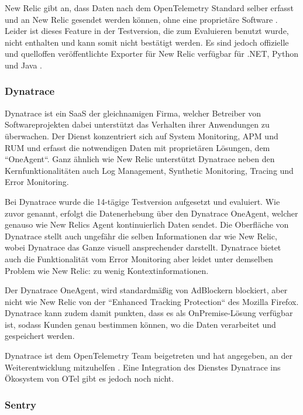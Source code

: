 New Relic gibt an, dass Daten nach dem OpenTelemetry Standard selber erfasst und an New Relic gesendet werden können, ohne eine proprietäre Software \cite{NewRelicAnnoundOTelBetaSupport}. Leider ist dieses Feature in der Testversion, die zum Evaluieren benutzt wurde, nicht enthalten und kann somit nicht bestätigt werden. Es sind jedoch offizielle und quelloffen veröffentlichte Exporter für New Relic verfügbar für .NET, Python und Java \cite{OpenTelemetryRegistry}.

\subsubsection{Dynatrace}

Dynatrace \cite{Dynatrace} ist ein SaaS der gleichnamigen Firma, welcher Betreiber von Softwareprojekten dabei unterstützt das Verhalten ihrer Anwendungen zu überwachen. Der Dienst konzentriert sich auf System Monitoring, APM und RUM und erfasst die notwendigen Daten mit proprietären Lösungen, dem ``OneAgent``. Ganz ähnlich wie New Relic unterstützt Dynatrace neben den Kernfunktionalitäten auch Log Management, Synthetic Monitoring, Tracing und Error Monitoring.

Bei Dynatrace wurde die 14-tägige Testversion aufgesetzt und evaluiert. Wie zuvor genannt, erfolgt die Datenerhebung über den Dynatrace OneAgent, welcher genauso wie New Relics Agent kontinuierlich Daten sendet. Die Oberfläche von Dynatrace stellt auch ungefähr die selben Informationen dar wie New Relic, wobei Dynatrace das Ganze visuell ansprechender darstellt. Dynatrace bietet auch die Funktionalität vom Error Monitoring aber leidet unter demselben Problem wie New Relic: zu wenig Kontextinformationen.

Der Dynatrace OneAgent, wird standardmäßig von AdBlockern blockiert, aber nicht wie New Relic von der ``Enhanced Tracking Protection`` des Mozilla Firefox. Dynatrace kann zudem damit punkten, dass es als OnPremise-Lösung verfügbar ist, sodass Kunden genau bestimmen können, wo die Daten verarbeitet und gespeichert werden.

Dynatrace ist dem OpenTelemetry Team beigetreten und hat angegeben, an der Weiterentwicklung mitzuhelfen \cite{DynatraceJoinOTelProject}. Eine Integration des Dienstes Dynatrace ins Ökosystem von OTel gibt es jedoch noch nicht.

\subsubsection{Sentry}

